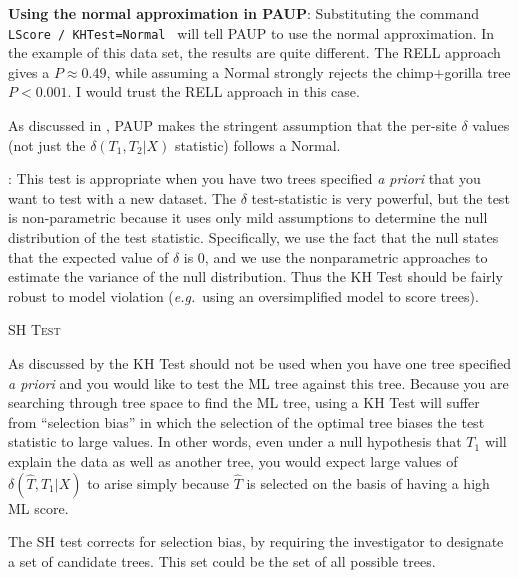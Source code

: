 \documentclass[11pt]{article}
\renewcommand{\section}[2]{%
\bigskip
\begin{center}
\begin{Large}
\normalfont\scshape #2
\medskip
\end{Large}
\end{center}}
\renewcommand{\subsection}[1]{%
\noindent{\large\scshape \underline{#1}}:}
\renewcommand{\subsubsection}[1]{%
\noindent\textbf{#1}:}
\begin{document}
\subsubsection{Using the normal approximation in PAUP} Substituting the command {\tt LScore / KHTest=Normal }	 will tell PAUP to use the normal approximation.
In the example of this data set, the results are quite different.
The RELL approach gives a $P \approx 0.49$, while assuming a Normal strongly rejects the chimp+gorilla tree $P < 0.001$.
I would trust the RELL approach in this case.

As discussed in \citet{GoldmanAR2000}, PAUP makes the stringent assumption that the per-site $\delta$ values (not just the $\delta\left(T_1,T_2|X\right)$ statistic) follows a Normal.

\subsection{Summary of the KH Test} This test is appropriate when you have two trees specified {\em a priori} that you want to test with a new dataset. 
The $\delta$ test-statistic is very powerful, but the test is non-parametric because it uses only mild assumptions to determine the null distribution of the test statistic. 
Specifically, we use the fact that the null states that the expected value of $\delta$ is 0, and we use the nonparametric approaches to estimate the variance of the null distribution.
Thus the KH Test should be fairly robust to model violation ({\em e.g.}~using an oversimplified model to score trees).

\newpage
\section*{SH Test \citep{ShimodairaH1999}}
As discussed by \citet{GoldmanAR2000} the KH Test should not be used when you have one tree specified {\em a priori} and you would like to test the ML tree against this tree.
Because you are searching through tree space to find the ML tree, using a KH Test will suffer from ``selection bias'' in which the selection of the optimal tree biases the test statistic to large values.
In other words, even under a null hypothesis that $T_1$ will explain the data as well as another tree, you would expect large values of $\delta(\hat{T}, T_1|X)$ to arise simply because $\hat{T}$ is selected on the basis of having a high ML score.

The SH test corrects for selection bias, by requiring the investigator to designate a set of candidate trees. 
This set could be the set of all possible trees.
\end{document}
